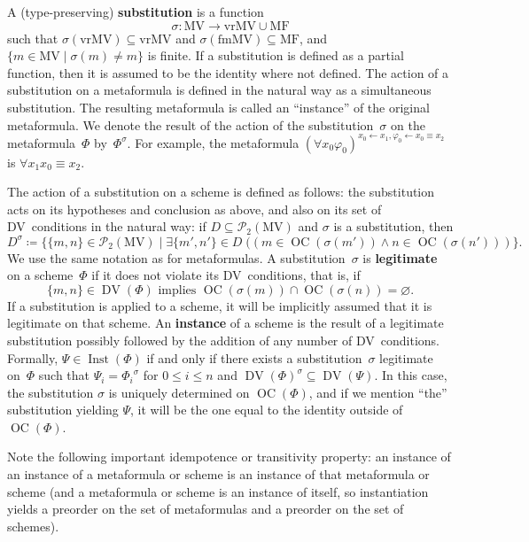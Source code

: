 \documentclass[11pt]{article}
\newcommand*{\define}[1]{\textbf{#1}}%
\renewcommand*{\phi}{\varphi}
\newcommand*{\calP}{\mathcal{P}}
\newcommand*{\vrMV}{\mathrm{vrMV}}
\newcommand*{\fmMV}{\mathrm{fmMV}}
\newcommand*{\MV}{\mathrm{MV}}
\newcommand*{\MF}{\mathrm{MF}}
\DeclareMathOperator{\DV}{DV}
\DeclareMathOperator{\OC}{OC}
\DeclareMathOperator{\Inst}{Inst}
\theoremstyle{plain}
\theoremstyle{definition}
\theoremstyle{remark}
\begin{document}
A (type-preserving) \define{substitution} is a function
\begin{equation}
\sigma \colon \MV \to \vrMV \cup \MF
\end{equation}
such that $\sigma(\vrMV) \subseteq \vrMV$ and $\sigma(\fmMV) \subseteq \MF$, and
$\{ m \in \MV \mid \sigma(m) \neq m \}$ is finite.
If a substitution is defined as a partial function, then it is assumed to be the identity where
not defined.
The action of a substitution on a metaformula is defined in the natural way as a simultaneous
substitution.
The resulting metaformula is called an ``instance'' of the original metaformula.
We denote the result of the action of the substitution~$\sigma$ on the metaformula~$\Phi$
by~$\Phi^\sigma$.
For example, the metaformula
$(\forall x_0 \phi_0)^{x_0 \leftarrow x_1, \phi_0 \leftarrow x_0\equiv x_2}$ is
$\forall x_1 x_0\equiv x_2$.

The action of a substitution on a scheme is defined as follows: the substitution acts on its
hypotheses and conclusion as above, and also on its set of DV~conditions in the natural way:
if $D \subseteq \calP_2(\MV)$ and $\sigma$ is a substitution, then
\begin{equation}
\label{eq:propagate}
D^\sigma \coloneqq \bigl\{
\{m, n\} \in \calP_2(\MV) \mid
\exists \{m', n'\} \in D \; (( m \in \OC(\sigma(m')) \wedge n \in \OC(\sigma(n')))
\bigr\}.
\end{equation}
We use the same notation as for metaformulas.
A substitution~$\sigma$ is \define{legitimate} on a scheme~$\Phi$ if it does not violate
its DV~conditions, that is, if
\begin{equation}
\label{eq:legitimateSubst}
\{m, n\} \in \DV(\Phi) \text{ implies }\OC(\sigma(m)) \cap \OC(\sigma(n)) = \varnothing.
\end{equation}
If a substitution is applied to a scheme, it will be implicitly assumed that it is legitimate
on that scheme.
An \define{instance} of a scheme is the result of a legitimate substitution possibly followed by
the addition of any number of DV~conditions.
Formally, $\Psi \in \Inst(\Phi)$ if and only if there exists a substitution~$\sigma$ legitimate
on~$\Phi$ such that $\Psi_i = {\Phi_i}^\sigma$ for $0 \leq i \leq n$ and
$\DV(\Phi)^\sigma \subseteq \DV(\Psi)$.
In this case, the substitution $\sigma$ is uniquely determined on $\OC(\Phi)$, and if we mention
``the'' substitution yielding $\Psi$, it will be the one equal to the identity outside
of~$\OC(\Phi)$.

Note the following important idempotence or transitivity property: an instance of an instance of a
metaformula or scheme is an instance of that metaformula or scheme (and a metaformula or scheme is
an instance of itself, so instantiation yields a preorder on the set of metaformulas and a preorder
on the set of schemes).
\end{document}
